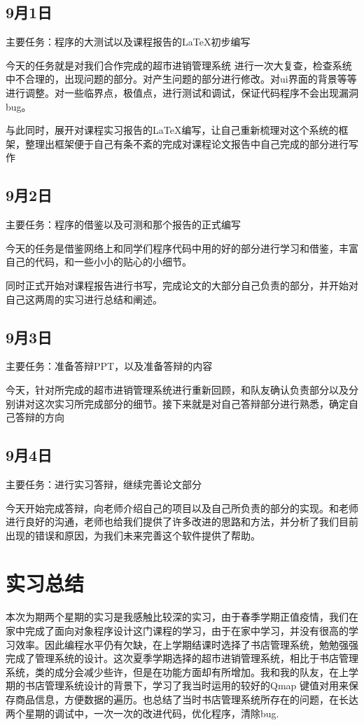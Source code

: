 \documentclass[
   projtype=report, %
   output=print,     %
  ]{nwafuprojrep}
\begin{document}
\subsection{9月1日}
主要任务：程序的大测试以及课程报告的\LaTeX 初步编写

今天的任务就是对我们合作完成的超市进销管理系统 进行一次大复查，检查系统中不合理的，出现问题的部分。对产生问题的部分进行修改。对ui界面的背景等等进行调整。对一些临界点，极值点，进行测试和调试，保证代码程序不会出现漏洞bug。

与此同时，展开对课程实习报告的\LaTeX 编写，让自己重新梳理对这个系统的框架，整理出框架便于自己有条不紊的完成对课程论文报告中自己完成的部分进行写作
\subsection{9月2日}
主要任务：程序的借鉴以及可测和那个报告的正式编写

今天的任务是借鉴网络上和同学们程序代码中用的好的部分进行学习和借鉴，丰富自己的代码，和一些小小的贴心的小细节。

同时正式开始对课程报告进行书写，完成论文的大部分自己负责的部分，并开始对自己这两周的实习进行总结和阐述。
\subsection{9月3日}
主要任务：准备答辩PPT，以及准备答辩的内容

今天，针对所完成的超市进销管理系统进行重新回顾，和队友确认负责部分以及分别讲对这次实习所完成部分的细节。接下来就是对自己答辩部分进行熟悉，确定自己答辩的方向

\subsection{9月4日}
主要任务：进行实习答辩，继续完善论文部分

今天开始完成答辩，向老师介绍自己的项目以及自己所负责的部分的实现。和老师进行良好的沟通，老师也给我们提供了许多改进的思路和方法，并分析了我们目前出现的错误和原因，为我们未来完善这个软件提供了帮助。

\section{实习总结}
本次为期两个星期的实习是我感触比较深的实习，由于春季学期正值疫情，我们在家中完成了面向对象程序设计这门课程的学习，由于在家中学习，并没有很高的学习效率。因此\ccpp 编程水平仍有欠缺，在上学期结课时选择了书店管理系统，勉勉强强完成了管理系统的设计。这次夏季学期选择的超市进销管理系统，相比于书店管理系统，类的成分会减少些许，但是在功能方面却有所增加。我和我的队友，在上学期的书店管理系统设计的背景下，学习了我当时运用的较好的Qmap 键值对用来保存商品信息，方便数据的遍历。也总结了当时书店管理系统所存在的问题，在长达两个星期的调试中，一次一次的改进代码，优化程序，清除bug.
\end{document}
